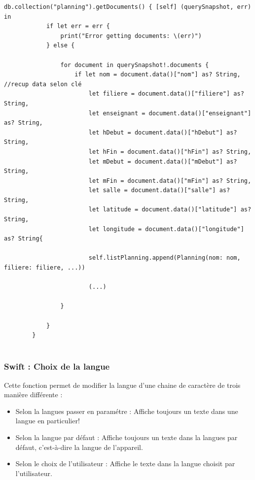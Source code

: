 \documentclass{article}
\begin{document}
\begin{verbatim}
db.collection("planning").getDocuments() { [self] (querySnapshot, err) in
            if let err = err {
                print("Error getting documents: \(err)")
            } else {
                
                for document in querySnapshot!.documents {
                    if let nom = document.data()["nom"] as? String,         //recup data selon clé
                        let filiere = document.data()["filiere"] as? String,
                        let enseignant = document.data()["enseignant"] as? String,
                        let hDebut = document.data()["hDebut"] as? String,
                        let hFin = document.data()["hFin"] as? String,
                        let mDebut = document.data()["mDebut"] as? String,
                        let mFin = document.data()["mFin"] as? String,
                        let salle = document.data()["salle"] as? String,
                        let latitude = document.data()["latitude"] as? String,
                        let longitude = document.data()["longitude"] as? String{
                    
                        self.listPlanning.append(Planning(nom: nom, filiere: filiere, ...))
                        
                        (...)
                    
                }
                
            }
        }


\end{verbatim}

\subsubsection{Swift : Choix de la langue}
Cette fonction permet de modifier la langue d'une chaine de caractère de trois manière différente :

\begin{itemize}
    \item Selon la langues passer en paramétre : Affiche toujours un texte dans une langue en particulier! 

    \item Selon la langue par défaut : Affiche toujours un texte dans la langues par défaut, c'est-à-dire la langue de l'appareil.

    \item Selon le choix de l'utilisateur : Affiche le texte dans la langue choisit par l'utilisateur.
\end{itemize}
\end{document}
